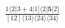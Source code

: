 \documentclass[varwidth, border=5pt]{standalone}
\begin{document}
\begin{my}
$\begin{gathered}
\scriptscriptstyle\frac{1⟨2|3+4|1]⟨2|𝟓|2]}{[12]⟨13⟩⟨24⟩⟨34⟩}
\end{gathered}$
\end{my}
\end{document}
